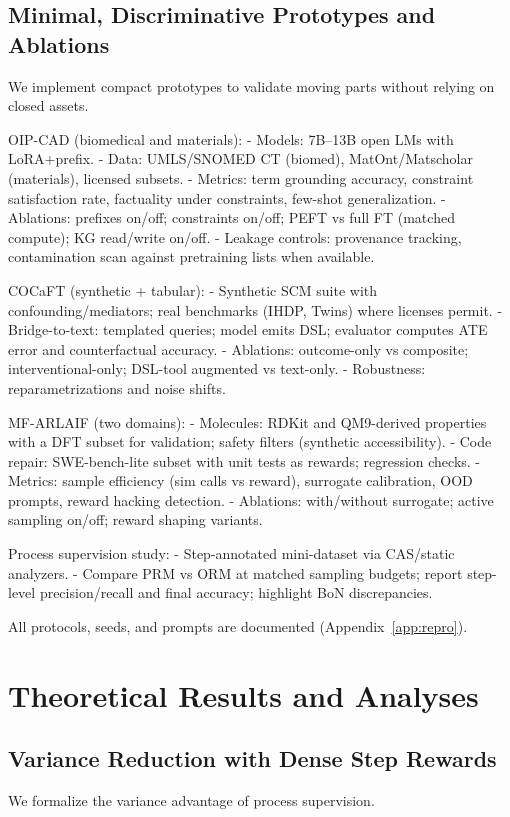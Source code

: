 \documentclass{article}
\begin{document}
\subsection{Minimal, Discriminative Prototypes and Ablations}
We implement compact prototypes to validate moving parts without relying on closed assets.

OIP-CAD (biomedical and materials):
- Models: 7B–13B open LMs with LoRA+prefix.
- Data: UMLS/SNOMED CT (biomed), MatOnt/Matscholar (materials), licensed subsets.
- Metrics: term grounding accuracy, constraint satisfaction rate, factuality under constraints, few-shot generalization.
- Ablations: prefixes on/off; constraints on/off; PEFT vs full FT (matched compute); KG read/write on/off.
- Leakage controls: provenance tracking, contamination scan against pretraining lists when available.

COCaFT (synthetic + tabular):
- Synthetic SCM suite with confounding/mediators; real benchmarks (IHDP, Twins) where licenses permit.
- Bridge-to-text: templated queries; model emits DSL; evaluator computes ATE error and counterfactual accuracy.
- Ablations: outcome-only vs composite; interventional-only; DSL-tool augmented vs text-only.
- Robustness: reparametrizations and noise shifts.

MF-ARLAIF (two domains):
- Molecules: RDKit and QM9-derived properties with a DFT subset for validation; safety filters (synthetic accessibility).
- Code repair: SWE-bench-lite subset with unit tests as rewards; regression checks.
- Metrics: sample efficiency (sim calls vs reward), surrogate calibration, OOD prompts, reward hacking detection.
- Ablations: with/without surrogate; active sampling on/off; reward shaping variants.

Process supervision study:
- Step-annotated mini-dataset via CAS/static analyzers.
- Compare PRM vs ORM at matched sampling budgets; report step-level precision/recall and final accuracy; highlight BoN discrepancies.

All protocols, seeds, and prompts are documented (Appendix~\ref{app:repro}).

\section{Theoretical Results and Analyses}
\subsection{Variance Reduction with Dense Step Rewards}
\label{sec:variance}
We formalize the variance advantage of process supervision.
\end{document}
